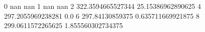 0 nan nan
1 nan nan
2 322.3594665527344 25.15386962890625
4 297.2055969238281 0.0
6 297.84130859375 0.635711669921875
8 299.0611572265625 1.855560302734375
